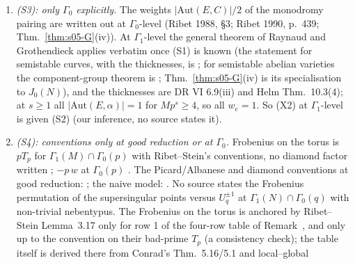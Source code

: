 \begin{remark}
\begin{enumerate}[label=(\alph*)]
  ;
  Edixhoven's chapter in .
\item \emph{(S3): only $\Gamma_0$ explicitly.} The weights $|\mathrm{Aut}(E,C)|/2$ of the monodromy pairing are written out at
  $\Gamma_0$-level (Ribet 1988, \S3; Ribet 1990, p.~439; Thm.~\ref{thm:s05-G}(iv)). At $\Gamma_1$-level the general theorem of
  Raynaud and Grothendieck applies verbatim once (S1) is known (the statement for semistable curves, with the thicknesses, is ; for semistable abelian varieties the component-group theorem is ; Thm.~\ref{thm:s05-G}(iv) is its specialisation to $J_0(N)$), and the
  thicknesses are DR VI 6.9(iii) and Helm Thm.~10.3(4); at $s\ge1$ all $|\mathrm{Aut}(E,\alpha)|=1$ for $Mp^s\ge4$, so all $w_e=1$.
  So (X2) at $\Gamma_1$-level is \stpmc{} given (S2) (our inference, no source states it).
\item \emph{(S4): conventions only at good reduction or at $\Gamma_0$.} Frobenius on the torus is $pT_p$ for
  $\Gamma_1(M)\cap\Gamma_0(p)$ with Ribet--Stein's conventions, no diamond factor written
  ; $-p\,w$ at $\Gamma_0(p)$
  . The Picard/Albanese and diamond
  conventions at good reduction: ; the
  naive model: . No source states the Frobenius permutation of the supersingular points versus $U_q^{\pm1}$ at $\Gamma_1(N)\cap\Gamma_0(q)$ with non-trivial nebentypus.
  The Frobenius on the torus is anchored by Ribet--Stein Lemma~3.17 only for row 1 of the four-row table of Remark~, and only up to
  the convention on their bad-prime $T_p$ (a consistency check); the table itself is derived there from Conrad's Thm.~5.16/5.1 and local--global

\end{enumerate}
\end{remark}
